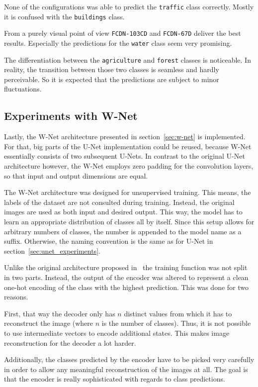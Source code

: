 None of the configurations was able to predict the \texttt{traffic} class correctly. Mostly it is confused with the \texttt{buildings} class.

From a purely visual point of view \texttt{FCDN-103CD} and \texttt{FCDN-67D} deliver the best results. Especially the predictions for the \texttt{water} class seem very promising.

The differentiation between the \texttt{agriculture} and \texttt{forest} classes is noticeable. In reality, the transition between those two classes is seamless and hardly perceivable. So it is expected that the predictions are subject to minor fluctuations.

\subsection{Experiments with W-Net}
\label{sec:wnet_experiments}
Lastly, the W-Net architecture presented in section~\ref{sec:w-net} is implemented. For that, big parts of the U-Net implementation could be reused, because W-Net essentially consists of two subsequent U-Nets. In contrast to the original U-Net architecture however, the W-Net employs zero padding for the convolution layers, so that input and output dimensions are equal.

The W-Net architecture was designed for unsupervised training. This means, the labels of the dataset are not consulted during training. Instead, the original images are used as both input and desired output. This way, the model has to learn an appropriate distribution of classes all by itself. Since this setup allows for arbitrary numbers of classes, the number is appended to the model name as a suffix. Otherwise, the naming convention is the same as for U-Net in section~\ref{sec:unet_experiments}.

Unlike the original architecture proposed in~\cite{wnet17} the training function was not split in two parts. Instead, the output of the encoder was altered to represent a clean one-hot encoding of the class with the highest prediction. This was done for two reasons.

First, that way the decoder only has $n$ distinct values from which it has to reconstruct the image (where $n$ is the number of classes). Thus, it is not possible to use intermediate vectors to encode additional states. This makes image reconstruction for the decoder a lot harder.

Additionally, the classes predicted by the encoder have to be picked very carefully in order to allow any meaningful reconstruction of the images at all. The goal is that the encoder is really sophisticated with regards to class predictions.


